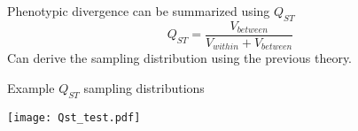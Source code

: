 \documentclass{beamer}
\begin{document}
\begin{frame}{Phenotypic divergence can be summarized using $Q_{ST}$}
  \begin{equation}
    \label{eq:qst}
    Q_{ST} = \frac{V_{between}}{V_{within}+V_{between}} \nonumber 
  \end{equation}
  Can derive the sampling distribution using the previous theory. 
\end{frame}

\begin{frame}{Example $Q_{ST}$ sampling distributions}
  \begin{center}
    \texttt{[image: Qst\_test.pdf]}
  \end{center}
\end{frame}
\end{document}

